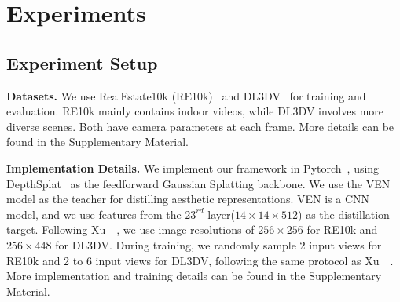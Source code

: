 \section{Experiments}
\label{sec:experiment}



\subsection{Experiment Setup}
\noindent\textbf{Datasets.}
We use RealEstate10k (RE10k)~\cite{re10k} and DL3DV~\cite{dl3dv} for training and evaluation. RE10k mainly contains indoor videos, while DL3DV involves more diverse scenes. Both have camera parameters at each frame. More details can be found in the Supplementary Material.

\noindent\textbf{Implementation Details.} We implement our framework in Pytorch~\cite{paszke2019pytorch}, using DepthSplat~\cite{depthsplat} as the feedforward Gaussian Splatting backbone. We use the VEN~\cite{wei2018good} model as the teacher for distilling aesthetic representations. VEN is a CNN model, and we use features from the $23^{rd}$ layer($14\times 14\times 512$) as the distillation target. Following Xu~\etal~\cite{depthsplat}, we use image resolutions of $256\times256$ for RE10k and $256\times448$ for DL3DV. During training, we randomly sample 2 input views for RE10k and 2 to 6 input views for DL3DV, following the same protocol as Xu~\etal~\cite{depthsplat}. More implementation and training details can be found in the Supplementary Material.


